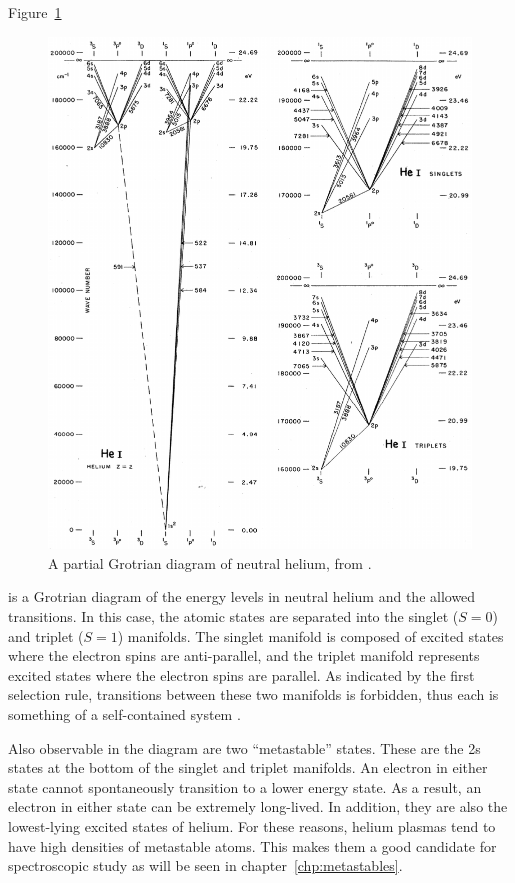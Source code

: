 Figure~\ref{fig:grotrian}
\begin{figure}
  \centering
  \includegraphics{./chapters/theory/figures/grotrian.pdf}
  \caption{A partial Grotrian diagram of neutral helium, from \cite{Moore1968}.}
  \label{fig:grotrian}
\end{figure}
is a Grotrian diagram of the energy levels in neutral helium and the allowed
transitions. In this case, the atomic states are separated into the singlet
($S=0$) and triplet ($S = 1$) manifolds. The singlet manifold is composed of
excited states where the electron spins are anti-parallel, and the triplet
manifold represents excited states where the electron spins are parallel. As
indicated by the first selection rule, transitions between these two manifolds
is forbidden, thus each is something of a self-contained system
\cite{Herzberg1944}.

Also observable in the diagram are two ``metastable'' states. These are the 2s
states at the bottom of the singlet and triplet manifolds. An electron in either
state cannot spontaneously transition to a lower energy state. As a result, an
electron in either state can be extremely long-lived. In addition, they are also
the lowest-lying excited states of helium. For these reasons, helium plasmas
tend to have high densities of metastable atoms. This makes them a good
candidate for spectroscopic study as will be seen in
chapter~\ref{chp:metastables}.

